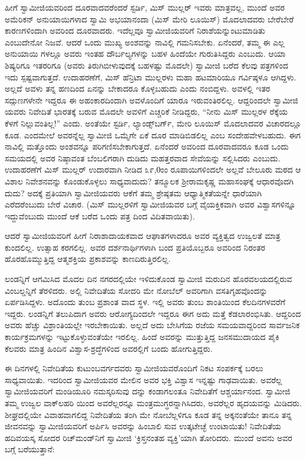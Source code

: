 ಹೀಗೆ ಸ್ವಾಮೀಜಿಯವರಿಂದ ದೂರವಾದವರೆಂದರೆ ಸ್ಟರ್ಡಿ, ಮಿಸ್ ಮುಲ್ಲರ್ ಇವರು ಮಾತ್ರವಲ್ಲ, ಮುಂದೆ ಅವರ ಅಮೆರಿಕನ್ ಅನುಯಾಯಿಗಳಾದ ಸ್ವಾಮಿ ಅಭಯಾನಂದಾ (ಮಿಸ್ ಮೇರಿ ಲೂಯಿಸ್​) ಮೊದಲಾದವರು ಬೇರೆಬೇರೆ ಕಾರಣಗಳಿಂದಾಗಿ ಅವರಿಂದ ದೂರವಾದರು. ಇದೆಲ್ಲವೂ ಸ್ವಾಮೀಜಿಯವರಿಗೆ ನಿರಾಶೆಯನ್ನುಂಟುಮಾಡಿತು ಎಂಬುದೇನೋ ನಿಜವೆ. ಆದರೆ ಒಂದು ಮುಖ್ಯ ಅಂಶವನ್ನು ನಾವಿಲ್ಲಿ ಗಮನಿಸಬೇಕು. ಏನೆಂದರೆ, ತಮ್ಮ ಈ ಎಲ್ಲ ಅನುಯಾಯಿ ಗಳಲ್ಲೂ ಅವರು ಇಂತಹ ದೌರ್ಬಲ್ಯಗಳನ್ನು ಬಹಳ ಹಿಂದೆಯೇ ಗುರುತಿಸಿದ್ದರು ಎಂಬುದು. ಆಯಾ ಶಿಷ್ಯರಿಗೂ ಇತರರಿಗೂ (ಅವರು ತಿರುಗಿಬೀಳುವುದಕ್ಕೆ ಬಹಳಷ್ಟು ಮೊದಲೇ) ಸ್ವಾಮೀಜಿ ಬರೆದ ಕೆಲವು ಪತ್ರಗಳಿಂದ ಇದು ಸ್ಪಷ್ಟವಾಗುತ್ತದೆ. ಉದಾಹರಣೆಗೆ, ಮಿಸ್ ಹೆನ್ರಿಟಾ ಮುಲ್ಲರಳು ಮಹಾ ಹಟಮಾರಿಯೂ ಗರ್ವಿಷ್ಠಳೂ ಆಗಿದ್ದಳು. ಅಲ್ಲದೆ ಅವಳು ತನ್ನ ಹಣದಿಂದ ಏನನ್ನು ಬೇಕಾದರೂ ಕೊಳ್ಳಬಹುದು ಎಂದು ನಂಬಿದ್ದಳು. ಅವಳಲ್ಲಿ ಇತರ ಸದ್ಗುಣಗಳೇನೇ ಇದ್ದರೂ ಈ ಅಹಂಕಾರದಿಂದಾಗಿ ಅವಳೊಂದಿಗೆ ಯಾರೂ ಇರುವಂತಿರಲಿಲ್ಲ. ಆದ್ದರಿಂದಲೇ ಸ್ವಾಮೀಜಿ ಯವರು ನಿವೇದಿತೆ ಭಾರತಕ್ಕೆ ಬರುವ ಮೊದಲೇ ಅವಳಿಗೆ ಎಚ್ಚರಿಕೆ ನೀಡಿದ್ದರು, “ನೀನು ಮಿಸ್ ಮುಲ್ಲರಳ ರೆಕ್ಕೆಯ ಕೆಳಗೆ ನಿಲ್ಲುವಂತಿಲ್ಲ!” ಎಂದು. ಅಂತೆಯೇ ಸ್ಟರ್ಡಿ, ಲ್ಯಾಂಡ್ಸ್​ಬರ್ಗ್, ಮೇರಿ ಲೂಯಿಸ್ ಮೊದಲಾದವರ ವಿಚಾರದಲ್ಲೂ ಕೂಡ. ಎಂದಮೇಲೆ ಅವರನ್ನೆಲ್ಲ ಸ್ವಾಮೀಜಿ ಒಮ್ಮೆಗೇ ಏಕೆ ದೂರ ಮಾಡಿಬಿಡಲಿಲ್ಲ ಎಂಬ ಸಂದೇಹವೇಳಬಹುದು. ಈಗ ನಾವಿಲ್ಲಿ ಮತ್ತೊಂದು ಅಂಶವನ್ನೂ ಪರಿಗಣಿಸಬೇಕಾಗುತ್ತದೆ. ಏನೆಂದರೆ ಅವರಿಂದ ದೂರವಾದವರೂ ಕೂಡ ಒಂದು ಸಮಯದಲ್ಲಿ ಅವರ ನಿಷ್ಠಾವಂತ ಬೆಂಬಲಿಗರಾಗಿ ದುಡಿದು ಮಹತ್ತರವಾದ ಸೇವೆಯನ್ನು ಸಲ್ಲಿಸಿದರು ಎಂಬುದು. ಉದಾಹರಣೆಗೆ ಮಿಸ್ ಮುಲ್ಲರ್ ಉದಾರವಾಗಿ ನೀಡಿದ ೩೯,0ಂಂ ರೂಪಾಯಿಗಳಿಂದಲೇ ಅಲ್ಲವೆ ಬೇಲೂರು ಮಠದ ಆ ವಿಶಾಲ ನಿವೇಶನವನ್ನು ಕೊಂಡುಕೊಳ್ಳಲು ಸಾಧ್ಯವಾದುದು? ತನ್ಮೂಲಕ ಶ್ರೀರಾಮಕೃಷ್ಣ ಮಹಾಸಂಘಕ್ಕೆ ಆಧಾರವೊದಗಿ ದುದು? ಅದಕ್ಕೆ ಪ್ರತಿಯಾಗಿ ಸ್ವಾಮೀಜಿಯವರು ಆಕೆಗೆ ತಮ್ಮ ಶ್ರೇಷ್ಠತಮ ಆಧ್ಯಾತ್ಮಿಕತೆಯನ್ನೇ ಧಾರೆಯಾಗಿ ಎರೆದರೆಂಬುದು ಬೇರೆ ವಿಚಾರ. (ಮಿಸ್ ಮುಲ್ಲರಳಿಗೆ ಸ್ವಾಮೀಜಿಯವರ ಬಗ್ಗೆ ವೈಯಕ್ತಿಕವಾಗಿ ಅವರ ವಿಶ್ವಾಸಗಳಿನ್ನೂ ಇದ್ದುವೆಂಬುದು ಮುಂದೆ ಆಕೆ ಬರೆದ ಒಂದು ಪತ್ರ ದಿಂದ ವಿದಿತವಾಯಿತು).

ಆದರೆ ಸ್ವಾಮೀಜಿಯವರಿಗೆ ಹೀಗೆ ನಿರಾಶಾದಾಯಕವಾದ ಆಘಾತಗಳಾದರೂ ಅವರ ವ್ಯಕ್ತಿತ್ವದ ಉಜ್ವಲತೆ ಮಾತ್ರ ಕುಂದಲಿಲ್ಲ. ಉತ್ಸಾಹ ಕರಗಲಿಲ್ಲ. ಅವರ ದರ್ಶನಾರ್ಥಿಗಳಾಗಿ ಬಂದ ಪ್ರತಿಯೊಬ್ಬರೂ ಅವರಿಂದ ನಿರಂತರ ಹೊರಹೊಮ್ಮುತ್ತಿದ್ದ ಆತ್ಮಶಕ್ತಿಯ ಪ್ರಕಾಶವನ್ನು ಕಾಣದಿರುತ್ತಿರಲಿಲ್ಲ.

ಲಂಡನ್ನಿಗೆ ಆಗಮಿಸಿದ ಮೊದಲ ದಿನ ನಗರದಲ್ಲಿಯೇ ಇಳಿದುಕೊಂಡ ಸ್ವಾಮೀಜಿ ಮರುದಿನ ಹೊರವಲಯದಲ್ಲಿರುವ ವಿಂಬಲ್ಡನ್ನಿಗೆ ತೆರಳಿದರು. ಅಲ್ಲಿ ನಿವೇದಿತೆಯ ಸೋದರಿ ಮೇ ನೋಬೆಲ್ ಅವರಿಗಾಗಿ ವಸತಿಗೃಹವೊಂದನ್ನು ಏರ್ಪಡಿಸಿದ್ದಳು. ಅದೊಂದು ತುಂಬ ಪ್ರಶಾಂತ ವಾದ ಸ್ಥಳ. ಇಲ್ಲಿ ಅವರು ತುಂಬ ಶಾಂತಿಯಿಂದ ಕೆಲದಿನಗಳವರೆಗೆ ಇದ್ದರು. ಲಂಡನ್ನಿಗೆ ತಲುಪಿದಾಗ ಅವರು ಆರೋಗ್ಯದಿಂದಲೇ ಇದ್ದರೂ ಈಗ ಅದು ಮತ್ತೆ ಕೆಡಲಾರಂಭಿಸಿತು. ಆದ್ದರಿಂದ ಅವರು ಹೆಚ್ಚು ವಿಶ್ರಾಂತಿಯಲ್ಲೇ ಇರಬೇಕಾಯಿತು. ಅಲ್ಲದೆ ಅದು ಬೇಸಿಗೆಯ ರಜೆಯ ಸಮಯವಾದ್ದರಿಂದ ಸಾರ್ವಜನಿಕ ಕಾರ್ಯಕ್ರಮಗಳನ್ನು ಇಟ್ಟುಕೊಳ್ಳುವಂತೆಯೇ ಇರಲಿಲ್ಲ. ಹಿಂದೆ ಅವರನ್ನು ಮುತ್ತುತ್ತಿದ್ದ ಜನಸಮುದಾಯದ ಪೈಕಿ ಕೆಲವರು ಮಾತ್ರ ಹಿಂದಿನ ವಿಶ್ವಾಸ-ಶ್ರದ್ಧೆಗಳಿಂದ ಅವರಲ್ಲಿಗೆ ಬಂದು ಹೋಗುತ್ತಿದ್ದರು.

ಈ ದಿನಗಳಲ್ಲಿ ನಿವೇದಿತೆಯ ಕುಟುಂಬವರ್ಗದವರು ಸ್ವಾಮೀಜಿಯವರೊಂದಿಗೆ ನಿಕಟ ಸಂಪರ್ಕಕ್ಕೆ ಬರಲು ಸಾಧ್ಯವಾಯಿತು. ಇದರಿಂದ ಸ್ವಾಮೀಜಿಯವರ ಮೇಲಿನ ಅವರ ಭಕ್ತಿ ವಿಶ್ವಾಸ ಇನ್ನಷ್ಟು ಗಾಢವಾಯಿತು. ಅವರೆಲ್ಲ ಸ್ವಾಮೀಜಿಯವರಿಗೆ ಮಂಡಿಯೂರಿ ನಮಸ್ಕರಿಸುವು ದನ್ನು ಕಂಡಾಗಲಂತೂ ನಿವೇದಿತೆಗೆ ಆಶ್ಚರ್ಯಾನಂದ. ಸ್ವಾಮೀಜಿ ತಮ್ಮ ಉಜ್ವಲ ವಾಕ್​ಲಹರಿ ಯಿಂದ ಅವರೆಲ್ಲರನ್ನೂ ಮಂತ್ರಮುಗ್ಧರನ್ನಾಗಿಸಿದರು, ಅವರೆಲ್ಲರ ಹೃದಯವನ್ನು ಮಿಡಿದರು. ಶೀಘ್ರದಲ್ಲಿಯೇ ವಿವಾಹವಾಗಲಿದ್ದ ನಿವೇದಿತೆಯ ತಂಗಿ ಮೇ ನೋಬೆಲ್ಲಳಿಗೂ ಕೂಡ ತನ್ನ ಅಕ್ಕನಂತೆಯೇ ತಾನೂ ತನ್ನ ಜೀವನವನ್ನು ಸ್ವಾಮೀಜಿಯವರಿಗೆ ಅರ್ಪಿಸಿ ಅವರನ್ನು ಹಿಂಬಾಲಿ ಸುವ ಉತ್ಕಟೇಚ್ಛೆ ಉಂಟಾಯಿತು! ನಿವೇದಿತೆಯ ಹದಿವಯಸ್ಕ ಸೋದರ ರಿಚ್​ಮಂಡ್​ನಿಗೆ ಸ್ವಾಮೀಜಿ ‘ಕ್ರಿಸ್ತನಂತಹ ವ್ಯಕ್ತಿ’ಯಾಗಿ ತೋರಿದರು. ಮುಂದೆ ಅವನು ಅವರ ಬಗ್ಗೆ ಬರೆಯುತ್ತಾನೆ:

